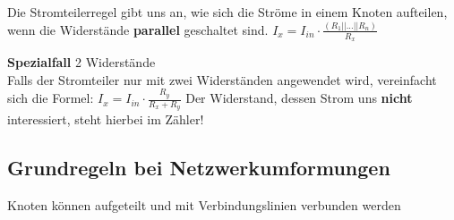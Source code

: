 \fix
{}
\begingl
Die Stromteilerregel gibt uns an, wie sich die Ströme in einem Knoten aufteilen, wenn die Widerstände \textbf{parallel} geschaltet sind.
\fspace
\formulaBegin
$\displaystyle I_x = I_{in} \cdot \frac{(R_1 || ... || R_n)} {R_x} $
\formulaEnd
\fix
\begin{center}
\end{center}
\fix
\textbf{Spezialfall} 2 Widerstände \\
Falls der Stromteiler nur mit zwei Widerständen angewendet wird, vereinfacht sich die Formel:
\fspace
\formulaBegin
$\displaystyle I_x = I_{in} \cdot \frac{R_y}{R_x + R_y} $
\formulaEnd
Der Widerstand, dessen Strom uns \textbf{nicht} interessiert, steht hierbei im Zähler!
\iend

\subsection{Grundregeln bei Netzwerkumformungen}
\fix \fix
{}
\beginip
Knoten können aufgeteilt und mit Verbindungslinien verbunden werden\\
\begin{center}
\end{center}
\iend

